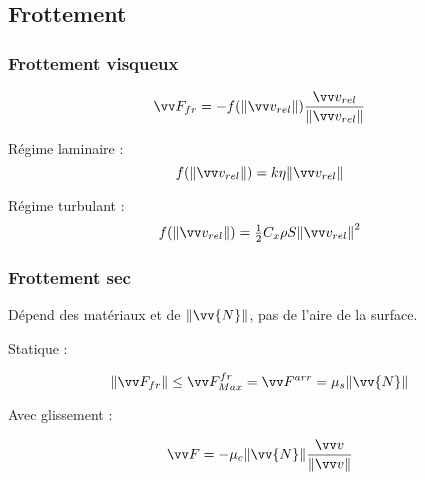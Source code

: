 \documentclass[../main.tex]{subfiles}
\begin{document}
\subsection{Frottement}


\subsubsection{Frottement visqueux}
\[
  \F_{fr} = -f(\norm{\vi_{rel}})\frac{\vi_{rel}}{\norm{\vi_{rel}}}
\]

Régime laminaire : 
\[
  f(\norm{\vi_{rel}})=k\eta\norm{\vi_{rel}}
\]

Régime turbulant :
\[
  f(\norm{\vi_{rel}}) = \tfrac{1}{2}C_x\rho S\norm{\vi_{rel}}^2
\]

\subsubsection{Frottement sec}
Dépend des matériaux et de \(\norm{\vv{N}}\), pas de l'aire de la surface. 

Statique :

\[
  \norm{\F_{fr}} \leq \F_{Max}^{fr} = \F^{arr}= \mu_s\norm{\vv{N}}
\]

Avec glissement :

\[
  \F=-\mu_c\norm{\vv{N}}\frac{\vi}{\norm{\vi}}
\]
\end{document}
